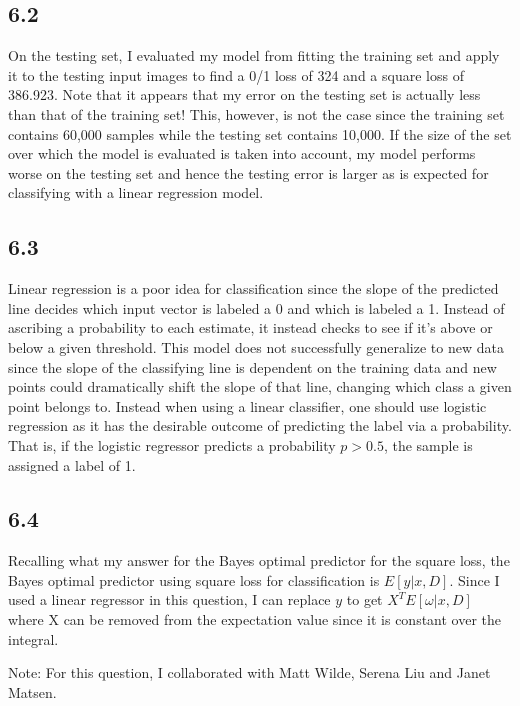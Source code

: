 \documentclass[12pt]{amsart}
\begin{document}
\subsection*{6.2}
On the testing set, I evaluated my model from fitting the training set and apply it to the testing input images to find a 0/1 loss of 324 and a square loss of 386.923.  Note that it appears that my error on the testing set is actually less than that of the training set!  This, however, is not the case since the training set contains 60,000 samples while the testing set contains 10,000.  If the size of the set over which the model is evaluated is taken into account, my model performs worse on the testing set and hence the testing error is larger as is expected for classifying with a linear regression model.

\subsection*{6.3}
Linear regression is a poor idea for classification since the slope of the predicted line decides which input vector is labeled a 0 and which is labeled a 1.  Instead of ascribing a probability to each estimate, it instead checks to see if it's above or below a given threshold.  This model does not successfully generalize to new data since the slope of the classifying line is dependent on the training data and new points could dramatically shift the slope of that line, changing which class a given point belongs to.  Instead when using a linear classifier, one should use logistic regression as it has the desirable outcome of predicting the label via a probability.  That is, if the logistic regressor predicts a probability $p > 0.5$, the sample is assigned a label of 1.

\subsection*{6.4}

Recalling what my answer for the Bayes optimal predictor for the square loss, the Bayes optimal predictor using square loss for classification is $E[y|x,D]$.  Since I used a linear regressor in this question, I can replace $y$ to get $X^TE[\omega|x,D]$ where X can be removed from the expectation value since it is constant over the integral.

Note: For this question, I collaborated with Matt Wilde, Serena Liu and Janet Matsen.

\end{document}
